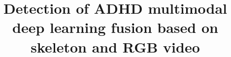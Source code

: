 \documentclass[conference,a4paper,english]{IEEEtran}[2015/08/26]
\begin{document}

\title{Detection of ADHD multimodal deep learning fusion based on skeleton and RGB video}

\author{%
  \and
}


\maketitle

%
%

\begin{abstract}
          
\end{abstract}

%
\IEEEpeerreviewmaketitle
\end{document}
